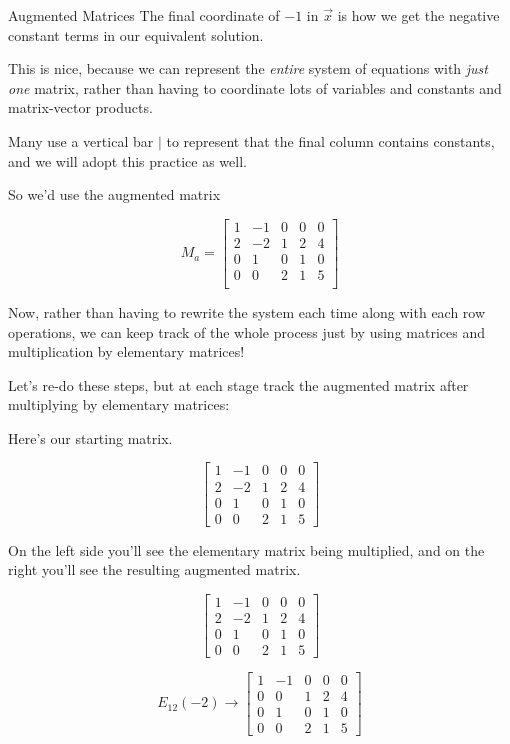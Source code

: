 \documentclass{ximera}
\begin{document}
\begin{remark}{Augmented Matrices}
The final coordinate of $-1$ in $\vec{x}$ is how we get the negative constant terms in our equivalent solution.

This is nice, because we can represent the \emph{entire} system of equations with \emph{just one} matrix, rather than having to coordinate lots of variables and constants and matrix-vector products.

Many use a vertical bar $|$ to represent that the final column contains constants, and we will adopt this practice as well. 

So we'd use the augmented matrix

\begin{equation}
  M_a=\left[\begin{array}{cccc|c}
    1 & -1 & 0 & 0 & 0\\
    2 & -2 & 1 & 2 & 4\\
    0 & 1  & 0 & 1 & 0\\
    0 & 0  & 2 & 1 & 5\\
  \end{array}\right]
\end{equation}

Now, rather than having to rewrite the system each time along with each row operations, we can keep track of the whole process just by using matrices and multiplication by elementary matrices!

\end{remark}

Let's re-do these steps, but at each stage track the augmented matrix after multiplying by elementary matrices:

Here's our starting matrix.

$$\left[\begin{array}{cccc|c} 
 1&-1&0&0&0\\2&-2&1&2&4\\0&1&0&1&0\\0&0&2&1&5
 \end{array}\right]$$

On the left side you'll see the elementary matrix being multiplied, and on the right you'll see the resulting augmented matrix.
 
$$\left[\begin{array}{cccc|c} 
 1&-1&0&0&0\\2&-2&1&2&4\\0&1&0&1&0\\0&0&2&1&5
 \end{array}\right]$$

 $$E_{12}(-2)\rightarrow%
 \left[\begin{array}{cccc|c} 
 1&-1&0&0&0\\0&0&1&2&4\\0&1&0&1&0\\0&0&2&1&5
 \end{array}\right]$$
\end{document}
